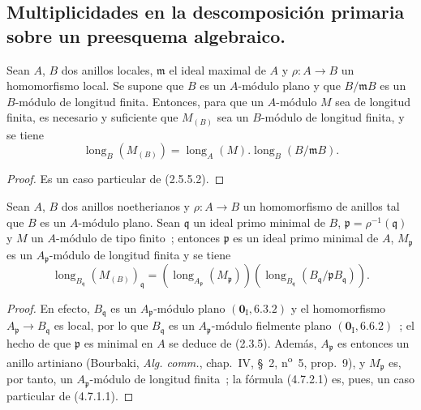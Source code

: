 \subsection{Multiplicidades en la descomposición primaria sobre un preesquema
algebraico.}
\label{subsection:IV.4.7-fr}

\begin{lemma}[4.7.1]
\label{IV.2.4.7.1-fr}
Sean $A$, $B$ dos anillos locales, $\mathfrak m$ el ideal maximal de $A$ y
$\rho:A\to B$ un homomorfismo local. Se supone que $B$ es un $A$-módulo plano
y que $B/\mathfrak mB$ es un $B$-módulo de longitud finita. Entonces, para que
un $A$-módulo $M$ sea de longitud finita, es necesario y suficiente que
$M_{(B)}$ sea un $B$-módulo de longitud finita, y se tiene
\begin{equation}
\operatorname{long}_B(M_{(B)})
=\operatorname{long}_A(M).\operatorname{long}_B(B/\mathfrak mB).
\tag{4.7.1.1}
\label{IV.2.4.7.1.1-fr}
\end{equation}
\end{lemma}

\begin{proof}
Es un caso particular de (2.5.5.2).
\end{proof}


\begin{corollary}[4.7.2]
\label{IV.2.4.7.2-fr}
Sean $A$, $B$ dos anillos noetherianos y $\rho:A\to B$ un homomorfismo de
anillos tal que $B$ es un $A$-módulo plano. Sean $\mathfrak q$ un ideal primo
minimal de $B$, $\mathfrak p=\rho^{-1}(\mathfrak q)$ y $M$ un $A$-módulo de
tipo finito~; entonces $\mathfrak p$ es un ideal primo minimal de $A$,
$M_{\mathfrak p}$ es un $A_{\mathfrak p}$-módulo de longitud finita y se tiene
\begin{equation}
\operatorname{long}_{B_{\mathfrak q}}(M_{(B)})_{\mathfrak q}
=(\operatorname{long}_{A_{\mathfrak p}}(M_{\mathfrak p}))
 (\operatorname{long}_{B_{\mathfrak q}}
 (B_{\mathfrak q}/\mathfrak pB_{\mathfrak q})).
\tag{4.7.2.1}
\label{IV.2.4.7.2.1-fr}
\end{equation}
\end{corollary}

\begin{proof}
En efecto, $B_{\mathfrak q}$ es un $A_{\mathfrak p}$-módulo plano
$(\mathbf{0}_{\mathrm I},6.3.2)$ y el homomorfismo
$A_{\mathfrak p}\to B_{\mathfrak q}$ es local, por lo que $B_{\mathfrak q}$ es
un $A_{\mathfrak p}$-módulo fielmente plano $(\mathbf{0}_{\mathrm I},6.6.2)$~; el hecho
de que $\mathfrak p$ es minimal en $A$ se deduce de (2.3.5). Además,
$A_{\mathfrak p}$ es entonces un anillo artiniano (Bourbaki, \emph{Alg. comm.},
chap.~IV, \S~2, n\textsuperscript{o}~5, prop.~9), y $M_{\mathfrak p}$ es, por
tanto, un $A_{\mathfrak p}$-módulo de longitud finita~; la fórmula (4.7.2.1) es,
pues, un caso particular de (4.7.1.1).
\end{proof}

